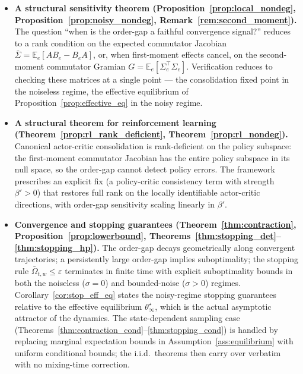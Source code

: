 \documentclass[12pt,a4paper]{article}
\begin{document}
\begin{itemize}
\item \textbf{A structural sensitivity theorem (Proposition~\ref{prop:local_nondeg},
      Proposition~\ref{prop:noisy_nondeg}, Remark~\ref{rem:second_moment}).}
      The question ``when is the order-gap a faithful convergence signal?''
      reduces to a rank condition on the expected commutator Jacobian
      $\bar\Sigma = \mathbb{E}_e[A B_e - B_e A]$, or, when first-moment effects
      cancel, on the second-moment commutator Gramian
      $G = \mathbb{E}_e[\Sigma_e^\top \Sigma_e]$. Verification reduces to
      checking these matrices at a single point — the consolidation fixed
      point in the noiseless regime, the effective equilibrium of
      Proposition~\ref{prop:effective_eq} in the noisy regime.

\item \textbf{A structural theorem for reinforcement learning
      (Theorem~\ref{prop:rl_rank_deficient},
      Theorem~\ref{prop:rl_nondeg}).}
      Canonical actor-critic consolidation is rank-deficient on the policy
      subspace: the first-moment commutator Jacobian has the entire policy
      subspace in its null space, so the order-gap cannot detect policy
      errors. The framework prescribes an explicit fix (a policy-critic
      consistency term with strength $\beta' > 0$) that restores full rank
      on the locally identifiable actor-critic directions, with order-gap
      sensitivity scaling linearly in $\beta'$.

\item \textbf{Convergence and stopping guarantees
      (Theorem~\ref{thm:contraction},
       Proposition~\ref{prop:lowerbound},
       Theorems~\ref{thm:stopping_det}--\ref{thm:stopping_hp}).}
      The order-gap decays geometrically along convergent trajectories;
      a persistently large order-gap implies suboptimality;
      the stopping rule $\bar\Omega_{t,w} \leq \varepsilon$ terminates in
      finite time with explicit suboptimality bounds in both the noiseless
      ($\sigma = 0$) and bounded-noise ($\sigma > 0$) regimes.
      Corollary~\ref{cor:stop_eff_eq} states the noisy-regime stopping
      guarantees relative to the effective equilibrium
      $\theta^\star_\infty$, which is the actual asymptotic attractor of
      the dynamics. The state-dependent sampling case
      (Theorems~\ref{thm:contraction_cond}--\ref{thm:stopping_cond}) is
      handled by replacing marginal expectation bounds in
      Assumption~\ref{ass:equilibrium} with uniform conditional bounds; the
      i.i.d.\ theorems then carry over verbatim with no mixing-time
      correction.


\end{itemize}
\end{document}
